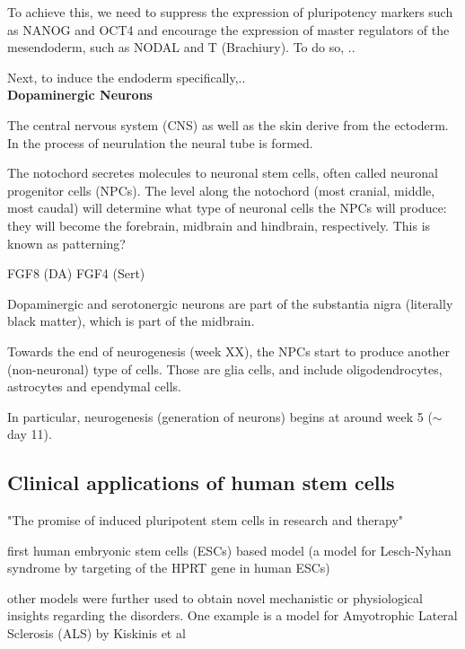 To achieve this, we need to suppress the expression of pluripotency markers such as NANOG and OCT4 and encourage the expression of master regulators of the mesendoderm, such as NODAL and T (Brachiury).
To do so, ..

Next, to induce the endoderm specifically,..\\

\textbf{Dopaminergic Neurons}

The central nervous system (CNS) as well as the skin derive from the ectoderm.
In the process of neurulation the 
neural tube
is formed.

The notochord secretes molecules to neuronal stem cells, often called neuronal progenitor cells (NPCs).  
The level along the notochord (most cranial, middle, most caudal) will determine what type of neuronal cells the NPCs will produce: they will become the forebrain, midbrain and hindbrain, respectively.
This is known as patterning?

FGF8 (DA)
FGF4 (Sert)

Dopaminergic and serotonergic neurons are part of the substantia nigra (literally black matter), which is part of the midbrain.

Towards the end of neurogenesis (week XX), the NPCs start to produce another (non-neuronal) type of cells.
Those are glia cells, and include oligodendrocytes, astrocytes and ependymal cells.


In particular, neurogenesis (generation of neurons) begins at around week 5 ($\sim$ day 11).

\subsection{Clinical applications of human stem cells}
\label{sec:human_stem_cell_applications}

"The promise of induced pluripotent stem cells in research and therapy" \cite{robinton2012promise}

first human embryonic stem cells (ESCs) based model (a model for Lesch-Nyhan syndrome by targeting of the HPRT gene in human ESCs)\cite{urbach2004modeling}
\cite{halevy2014comparing}

other models were further used to obtain novel mechanistic or physiological insights regarding the disorders. One example is a model for Amyotrophic Lateral Sclerosis (ALS) by Kiskinis et al \cite{kiskinis2014pathways} \\



